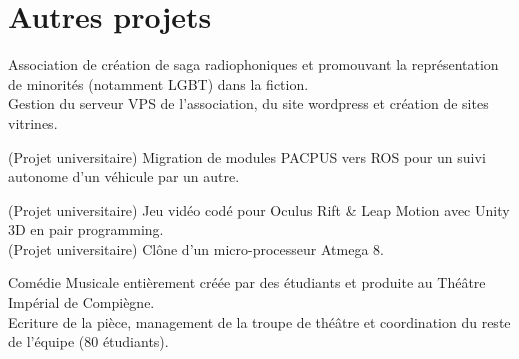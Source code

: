 \documentclass[]{cv-template}
\begin{document}
\begin{minipage}[t]{0.65\textwidth}


\section{Autres projets}
Association de création de saga radiophoniques et promouvant la représentation de minorités (notamment LGBT) dans la fiction.\\
Gestion du serveur VPS de l'association, du site wordpress et création de sites vitrines.

(Projet universitaire) Migration de modules PACPUS vers ROS pour un suivi autonome d'un véhicule par un autre.


(Projet universitaire) Jeu vidéo codé pour Oculus Rift \& Leap Motion avec Unity 3D en pair programming. \\

(Projet universitaire) Clône d'un micro-processeur Atmega 8.

Comédie Musicale entièrement créée par des étudiants et produite au Théâtre Impérial de Compiègne. \\
Ecriture de la pièce, management de la troupe de théâtre et coordination du reste de l'équipe (80 étudiants).



\sectionsep 

\end{minipage} 
\end{document}
